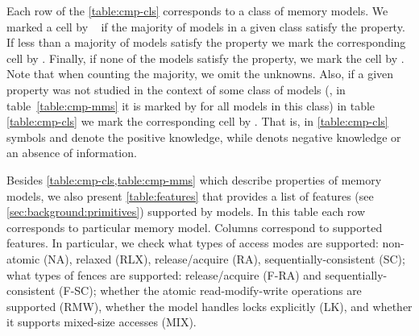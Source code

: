 Each row of the \cref{table:cmp-cls} corresponds to a class of memory models.
We marked a cell by \cmark~ if the majority of models in a given class satisfy the property. 
If less than a majority of models satisfy the property we mark 
the corresponding cell by \wmark.
Finally, if none of the models satisfy the property, we mark the cell by \xmark. 
Note that when counting the majority, we omit the unknowns.
Also, if a given property was not studied in the context of some class of models 
(\ie, in table~\cref{table:cmp-mms} it is marked by \qmark for all models in this class)
in table \cref{table:cmp-cls} we mark the corresponding cell by \xmark. 
That is, in \cref{table:cmp-cls} symbols \cmark and \wmark denote the positive knowledge,
while \xmark denots negative knowledge or an absence of information.

Besides \cref{table:cmp-cls,table:cmp-mms} which describe 
properties of memory models, we also present \cref{table:features}
that provides a list of features (see \cref{sec:background:primitives}) 
supported by models.
In this table each row corresponds to particular memory model. 
Columns correspond to supported features. 
In particular, we check what types of access modes are supported:
non-atomic (NA), relaxed (RLX), release/acquire (RA), sequentially-consistent (SC); 
what types of fences are supported: release/acquire (F-RA) and sequentially-consistent (F-SC);
whether the atomic read-modify-write operations are supported (RMW),
whether the model handles locks explicitly (LK),
and whether it supports mixed-size accesses (MIX).

